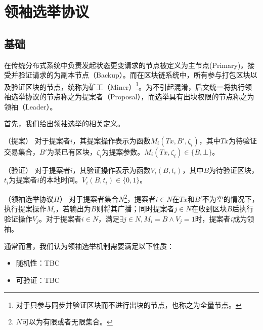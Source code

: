 \section{领袖选举协议}
\subsection{基础}
在传统分布式系统\cite{lamport2001paxos,castro1999practical}中负责发起状态更变请求的节点被定义为主节点(Primary)，接受并验证请求的为副本节点（Backup）。而在区块链系统中，所有参与打包区块以及验证区块的节点，统称为矿工（Miner）\footnote{对于只参与同步并验证区块而不进行出块的节点，也称之为全量节点。}。为不引起混淆，后文统一将执行领袖选举协议的节点称之为提案者（Proposal），而选举具有出块权限的节点称之为领袖（Leader）。

首先，我们给出领袖选举的相关定义。
\begin{definition}
（提案） 对于提案者$i$，其提案操作表示为函数$M_i(Tx,B',\zeta_i)$，其中$Tx$为待验证交易集合，$B'$为某已有区块，$\zeta_i$为提案参数。$M_i(Tx,\zeta_i)\in\{B,\bot\}$。
\end{definition}


\begin{definition}
（验证） 对于提案者$i$，其验证操作表示为函数$V_i(B,t_i)$，其中$B$为待验证区块，$t_i$为提案者$i$的本地时间。$V_i(B,t_i)\in\{0,1\}$。
\end{definition}

\begin{definition}
（领袖选举协议$\Pi$） 对于提案者集合$N$\footnote{$N$可以为有限或者无限集合。}，提案者$i\in N$在$Tx$和$B'$不为空的情况下，执行提案操作$M_i$，若输出为$B$则将其广播；同时提案者$j \in N$在收到区块$B$后执行验证操作$V_j$。对于提案者$i\in N$，满足$\exists j\in N,M_i=B\wedge V_j=1$时，提案者$i$成为领袖。

\end{definition}



通常而言，我们认为领袖选举机制需要满足以下性质：

\begin{itemize}
  \item 随机性：TBC%
  \item 可验证：TBC%
\end{itemize}

